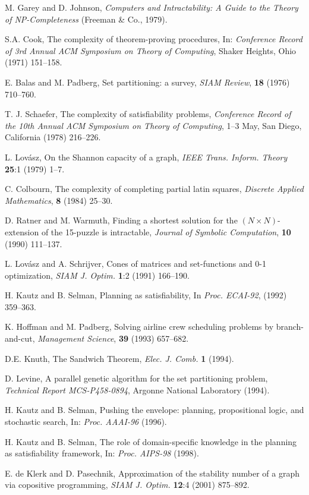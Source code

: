 \documentclass[11pt]{article}
\begin{document}
\begin{thebibliography}{30}

  M. Garey and D. Johnson,
  {\em Computers and Intractability: A Guide to the Theory of NP-Completeness\/}
  (Freeman \& Co., 1979).

  S.A. Cook,
  The complexity of theorem-proving procedures,
  In: {\em Conference Record of 3rd Annual ACM Symposium on Theory of Computing\/}, Shaker Heights, Ohio (1971) 151--158.

  E. Balas and M. Padberg,
  Set partitioning: a survey,
  {\em SIAM Review\/}, {\bf 18} (1976) 710--760.

  T. J. Schaefer,
  The complexity of satisfiability problems,
  {\em Conference Record of the 10th Annual ACM Symposium on Theory of Computing\/}, 1--3 May, San Diego, California (1978) 216--226.

  L. Lov\'asz, On the Shannon capacity of a graph,
  {\em IEEE Trans. Inform. Theory\/} {\bf 25}:1 (1979) 1--7.

  C. Colbourn,
  The complexity of completing partial latin squares,
  {\em Discrete Applied Mathematics\/}, {\bf 8} (1984) 25--30.

  D. Ratner and M. Warmuth,
  Finding a shortest solution for the $(N \times N)$-extension of the 15-puzzle is intractable,
  {\em Journal of Symbolic Computation\/}, {\bf 10} (1990) 111--137.

  L. Lov\'asz and A. Schrijver,
  Cones of matrices and set-functions and 0-1 optimization,
  {\em SIAM J. Optim.\/} {\bf 1}:2 (1991) 166--190.

  H. Kautz and B. Selman,
  Planning as satisfiability,
  In {\em Proc. ECAI-92\/}, (1992) 359--363.

  K. Hoffman and M. Padberg,
  Solving airline crew scheduling problems by branch-and-cut,
  {\em Management Science\/}, {\bf 39} (1993) 657--682.

  D.E. Knuth, The Sandwich Theorem,
  {\em Elec. J. Comb.} {\bf 1} (1994).

  D. Levine,
  A parallel genetic algorithm for the set partitioning problem,
  {\em Technical Report MCS-P458-0894\/}, Argonne National Laboratory (1994).

  H. Kautz and B. Selman,
  Pushing the envelope: planning, propositional logic, and stochastic search,
  In: {\em Proc. AAAI-96} (1996).

  H. Kautz and B. Selman,
  The role of domain-specific knowledge in the planning as satisfiability framework,
  In: {\em Proc. AIPS-98} (1998).

  E. de Klerk and D. Pasechnik,
  Approximation of the stability number of a graph via copositive programming,
  {\em SIAM J. Optim.\/} {\bf 12}:4 (2001) 875--892.

\end{thebibliography}
\end{document}
